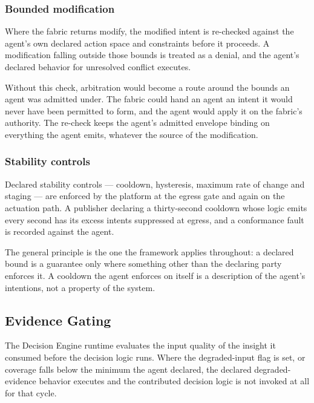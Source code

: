 \hypertarget{bounded-modification}{%
\subsubsection{Bounded modification}\label{bounded-modification}}

Where the fabric returns modify, the modified intent is re-checked
against the agent's own declared action space and constraints before it
proceeds. A modification falling outside those bounds is treated as a
denial, and the agent's declared behavior for unresolved conflict
executes.

Without this check, arbitration would become a route around the bounds
an agent was admitted under. The fabric could hand an agent an intent it
would never have been permitted to form, and the agent would apply it on
the fabric's authority. The re-check keeps the agent's admitted envelope
binding on everything the agent emits, whatever the source of the
modification.

\hypertarget{stability-controls}{%
\subsubsection{Stability controls}\label{stability-controls}}

Declared stability controls --- cooldown, hysteresis, maximum rate of
change and staging --- are enforced by the platform at the egress gate
and again on the actuation path. A publisher declaring a thirty-second
cooldown whose logic emits every second has its excess intents
suppressed at egress, and a conformance fault is recorded against the
agent.

The general principle is the one the framework applies throughout: a
declared bound is a guarantee only where something other than the
declaring party enforces it. A cooldown the agent enforces on itself is
a description of the agent's intentions, not a property of the system.

\hypertarget{evidence-gating}{%
\subsection{Evidence Gating}\label{evidence-gating}}

The Decision Engine runtime evaluates the input quality of the insight
it consumed before the decision logic runs. Where the degraded-input
flag is set, or coverage falls below the minimum the agent declared, the
declared degraded-evidence behavior executes and the contributed
decision logic is not invoked at all for that cycle.

